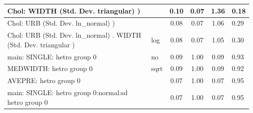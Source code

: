 \begin{table}
\begin{center}
\begin{tabular}{|l|l|c|c|c|l|}
			\hline
			 Chol: WIDTH (Std. Dev. triangular) ) &  & 0.10 & 0.07 & 1.36 & 0.18 \\
			\hline
			 Chol: URB (Std. Dev. ln_normal) ) &  & 0.08 & 0.07 & 1.06 & 0.29 \\
			\hline
			 Chol: URB (Std. Dev. ln_normal) . WIDTH (Std. Dev.   triangular ) & log & 0.08 & 0.07 & 1.05 & 0.30 \\
			\hline
			main: SINGLE: hetro group 0 & no & 0.09 & 1.00 & 0.09 & 0.93 \\
			\hline
			MEDWIDTH: hetro group 0 & sqrt & 0.09 & 1.00 & 0.09 & 0.92 \\
			\hline
			AVEPRE: hetro group 0 &  & 0.07 & 1.00 & 0.07 & 0.95 \\
			\hline
			main: SINGLE: hetro group 0:normal:sd  hetro group 0 &  & 0.07 & 1.00 & 0.07 & 0.95 \\
			\hline
		\end{tabular}
	\end{center}
\end{table}